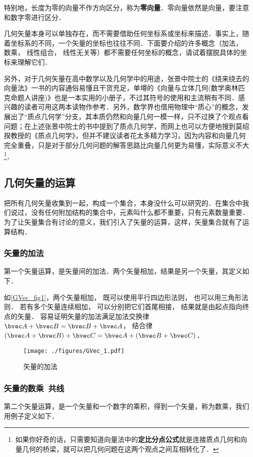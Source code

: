 特别地，长度为零的向量不作方向区分，称为\textbf{零向量}．零向量依然是向量，要注意和数字零进行区分．

几何矢量本身可以单独存在，而不需要借助任何坐标系或坐标来描述．事实上，随着坐标系的不同，一个矢量的坐标也往往不同．下面要介绍的许多概念（加法， 数乘， 线性组合， 线性无关等）都不需要任何坐标的概念，请试着摆脱具体的坐标来理解它们．

另外，对于几何矢量在高中数学以及几何学中的用途，张景中院士的《绕来绕去的向量法》一书的内容通俗易懂且干货充足，单墫的《向量与立体几何(数学奥林匹克命题人讲座)》也是一本实用的小册子，不过其符号的使用和主流稍有不同．感兴趣的读者可用这两本读物作参考．另外，数学界也借用物理中“质心”的概念，发展出了“质点几何学”分支，其本质仍然和向量几何一模一样，只不过换了个观点看问题；在上述张景中院士的书中提到了质点几何学，而网上也可以方便地搜到莫绍揆教授的《质点几何学》，但并不建议读者花太多精力学习，因为内容和向量几何完全重叠，只是对于部分几何问题的解答思路比向量几何更为易懂，实际意义不大\footnote{如果你好奇的话，只需要知道向量法中的\textbf{定比分点公式}就是连接质点几何和向量几何的桥梁，就可以把几何问题在这两个观点之间互相转化了．}．

\subsection{几何矢量的运算}

把所有几何矢量收集到一起，构成一个集合，本身没什么可以研究的．在集合中我们说过，没有任何附加结构的集合中，元素叫什么都不重要，只有元素数量重要．为了让矢量集合有讨论的意义，我们引入了矢量的运算，这样，矢量集合就有了运算结构．

\subsubsection{矢量的加法}
第一个矢量运算，是矢量间的加法．两个矢量相加，结果是另一个矢量，其定义如下．

如\autoref{GVec_fig1}，两个矢量相加， 既可以使用平行四边形法则， 也可以用三角形法则． 若有多个矢量连续相加， 可以分别把它们首尾相接， 结果就是由起点指向终点的矢量． 容易证明矢量的加法满足加法交换律 $\bvec A + \bvec B = \bvec B + \bvec A$， 结合律 $(\bvec A + \bvec B) + \bvec C = \bvec A + (\bvec B + \bvec C)$．
\begin{figure}[ht]
\centering
\texttt{[image: ./figures/GVec\_1.pdf]}
\caption{矢量的加法} \label{GVec_fig1}
\end{figure}

\subsubsection{矢量的数乘\ 共线}
第二个矢量运算，是一个矢量和一个数字的乘积，得到一个矢量，称为数乘，我们用例子定义如下．

